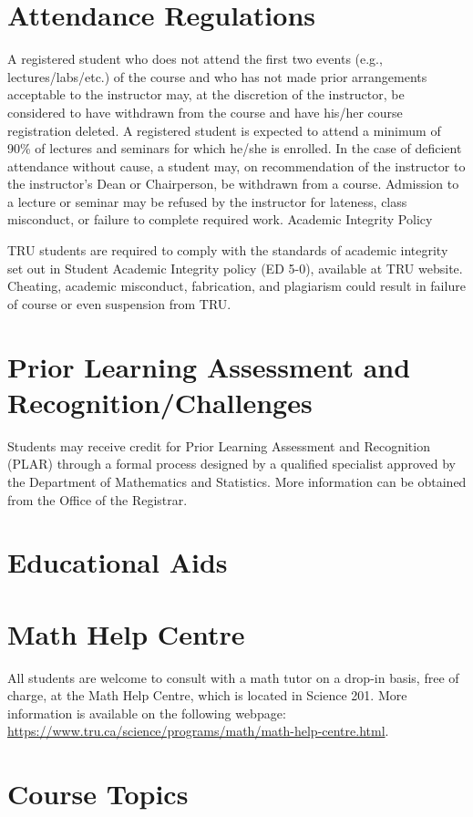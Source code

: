 \documentclass[10pt]{trumathoutline}
\begin{document}
\section*{Attendance Regulations}
A registered student who does not attend the first two events (e.g., lectures/labs/etc.) of the course and who has not made prior arrangements acceptable to the instructor may, at the discretion of the instructor, be considered to have withdrawn from the course and have his/her course registration deleted. A registered student is expected to attend a minimum of 90\% of lectures and seminars for which he/she is enrolled. In the case of deficient attendance without cause, a student may, on recommendation of the instructor to the instructor’s Dean or Chairperson, be withdrawn from a course. Admission to a lecture or seminar may be refused by the instructor for lateness, class misconduct, or failure to complete required work. 
Academic Integrity Policy

TRU students are required to comply with the standards of academic integrity set out in Student Academic Integrity policy (ED 5-0), available at TRU website. Cheating, academic misconduct, fabrication, and plagiarism could result in failure of course or even suspension from TRU. 

\section*{Prior Learning Assessment and Recognition/Challenges}

Students may receive credit for Prior Learning Assessment and Recognition (PLAR) through a formal process designed by a qualified specialist approved by the Department of Mathematics and Statistics. More information can be obtained from the Office of the Registrar.

\section*{Educational Aids}
\educationalaids

\section*{Math Help Centre}
All students are welcome to consult with a math tutor on a drop-in basis, free of charge, at the Math Help Centre, which is located in Science 201.  More information is available on the following webpage: \href{https://www.tru.ca/science/programs/math/math-help-centre.html}{https://www.tru.ca/science/programs/math/math-help-centre.html}. 

\newpage
\section*{Course Topics}
\coursetopics
\end{document}
